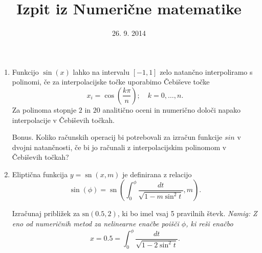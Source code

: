 \documentclass[slovene]{article}
\DeclareMathOperator*\sn{sn}
\begin{document}
\title{Izpit iz Numerične matematike}


\date{26. 9. 2014}
\maketitle
\begin{enumerate}
\item Funkcijo $\sin(x)$ lahko na intervalu $[-1,1]$ zelo natančno interpoliramo s polinomi, če za interpolacijske točke uporabimo Čebiševe točke
$$
x_i=\cos(\frac{k\pi}{n}); \quad k=0,\ldots,n.
$$ 
Za polinoma stopnje $2$ in $20$ analitično oceni in numerično določi napako interpolacije v Čebiševih točkah. 

Bonus. Koliko računskih operacij bi potrebovali za izračun funkcije $sin$ 
v dvojni natančnosti, če bi jo računali z interpolacijskim polinomom v Čebiševih točkah? 

\item Eliptična funkcija $y=\sn(x,m)$ je definirana z relacijo
\begin{equation}
\sin(\phi)=\sn\left(\int_0^\phi\frac{dt}{\sqrt{1-m\sin^2t}},m\right).\label{eq:sn}
\end{equation}

Izračunaj približek za $\mathrm{sn}(0.5,2)$, ki bo imel vsaj 5 pravilnih števk. \emph{Namig: Z eno od 
numeričnih metod za nelinearne enačbe poišči $\phi$, ki reši enačbo
\begin{equation}
  \label{eq:enacba}
   x = 0.5 = \int_0^\phi\frac{dt}{\sqrt{1-2\sin^2t}}.
\end{equation}}
\end{enumerate}
\end{document}
